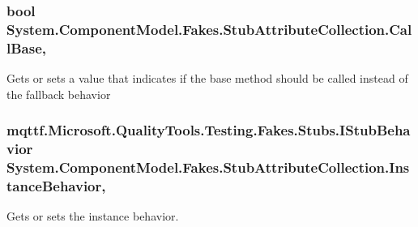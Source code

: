 \hypertarget{class_system_1_1_component_model_1_1_fakes_1_1_stub_attribute_collection_ab75aecc28c0eb27d40e3f231c2ff536c}{
\subsubsection[{Call\-Base}]{\setlength{\rightskip}{0pt plus 5cm}bool System.\-Component\-Model.\-Fakes.\-Stub\-Attribute\-Collection.\-Call\-Base\hspace{0.3cm}{\ttfamily [get]}, {\ttfamily [set]}}}\label{class_system_1_1_component_model_1_1_fakes_1_1_stub_attribute_collection_ab75aecc28c0eb27d40e3f231c2ff536c}


Gets or sets a value that indicates if the base method should be called instead of the fallback behavior

\hypertarget{class_system_1_1_component_model_1_1_fakes_1_1_stub_attribute_collection_a126ce11d831e3c9158f2533c8653ba5b}{
\subsubsection[{Instance\-Behavior}]{\setlength{\rightskip}{0pt plus 5cm}mqttf.\-Microsoft.\-Quality\-Tools.\-Testing.\-Fakes.\-Stubs.\-I\-Stub\-Behavior System.\-Component\-Model.\-Fakes.\-Stub\-Attribute\-Collection.\-Instance\-Behavior\hspace{0.3cm}{\ttfamily [get]}, {\ttfamily [set]}}}\label{class_system_1_1_component_model_1_1_fakes_1_1_stub_attribute_collection_a126ce11d831e3c9158f2533c8653ba5b}


Gets or sets the instance behavior.


